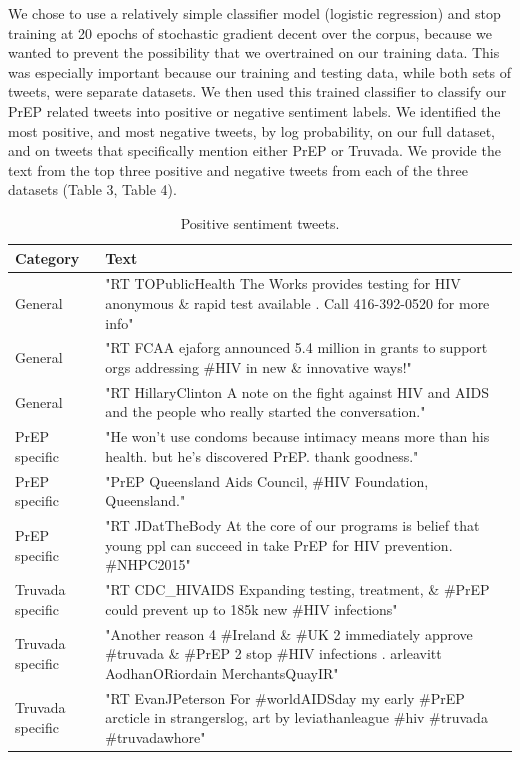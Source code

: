 \documentclass{sig-alternate-05-2015}
\begin{document}
We chose to use a relatively simple classifier model (logistic regression) and stop training at 20 epochs of stochastic gradient decent over the corpus, because we wanted to prevent the possibility that we overtrained on our training data. This was especially important because our training and testing data, while both sets of tweets, were separate datasets. We then used this trained classifier to classify our PrEP related tweets into positive or negative sentiment labels. We identified the most positive, and most negative tweets, by log probability, on our full dataset, and on tweets that specifically mention either PrEP or Truvada. We provide the text from the top three positive and negative tweets from each of the three datasets (Table 3, Table 4).

\begin{table}
\centering
\caption{Positive sentiment tweets.}
\begin{tabular}{|p{2.5cm}|p{12cm}|} \hline
Category & Text\\ \hline
General & "RT TOPublicHealth The Works provides testing for HIV anonymous \& rapid test available . Call 416-392-0520 for more info"\\ \hline
General & "RT FCAA ejaforg announced 5.4 million in grants to support orgs addressing \#HIV in new \& innovative ways!"\\ \hline
General & "RT HillaryClinton A note on the fight against HIV and AIDS and the people who really started the conversation."\\ \hline

PrEP specific & "He won't use condoms because intimacy means more than his health. but he's discovered PrEP. thank goodness."\\ \hline
PrEP specific & "PrEP Queensland Aids Council, \#HIV Foundation, Queensland."\\ \hline
PrEP specific & "RT JDatTheBody At the core of our programs is belief that young ppl can succeed in take PrEP for HIV prevention. \#NHPC2015"\\ \hline

Truvada specific & "RT CDC\_HIVAIDS Expanding testing, treatment, \& \#PrEP could prevent up to 185k new \#HIV infections"\\ \hline
Truvada specific & "Another reason 4 \#Ireland \& \#UK 2 immediately approve \#truvada \& \#PrEP 2 stop \#HIV infections . arleavitt AodhanORiordain MerchantsQuayIR"\\ \hline
Truvada specific & "RT EvanJPeterson For \#worldAIDSday my early \#PrEP arcticle in strangerslog, art by leviathanleague \#hiv \#truvada \#truvadawhore"\\ \hline

\hline\end{tabular}
\end{table}
\end{document}

